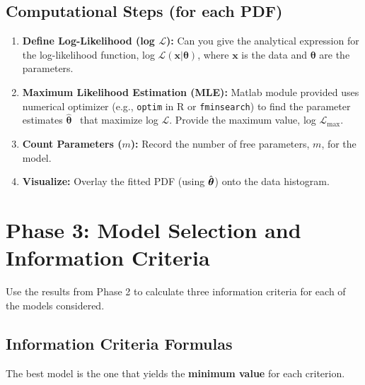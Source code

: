 \documentclass[12pt,thmsa]{article}
\begin{document}
\subsection{Computational Steps (for each PDF)}

\begin{enumerate}
\item \textbf{Define Log-Likelihood (log $\mathcal{L}$):} Can you give the
analytical expression for the log-likelihood function, log $\mathcal{L}(%
\mathbf{x}|\boldsymbol{\theta })$, where $\mathbf{x}$ is the data and $%
\boldsymbol{\theta }$ are the parameters.

\item \textbf{Maximum Likelihood Estimation (MLE):} Matlab module provided
uses numerical optimizer (e.g., \texttt{optim} in R or \texttt{fminsearch})
to find the parameter estimates $\hat{\boldsymbol{\theta }}$ \ that maximize
log $\mathcal{L}$. Provide the maximum value, log $\mathcal{L}_{\max }$.

\item \textbf{Count Parameters ($m$):} Record the number of free parameters, 
$m$, for the model.

\item \textbf{Visualize:} Overlay the fitted PDF (using $\hat{\boldsymbol{%
\theta }}$) onto the data histogram.
\end{enumerate}

\smallskip

\section{Phase 3: Model Selection and Information Criteria}

\smallskip

Use the results from Phase 2 to calculate three information criteria for
each of the models considered.

\subsection{Information Criteria Formulas}

\smallskip

The best model is the one that yields the \textbf{minimum value} for each
criterion.
\end{document}
